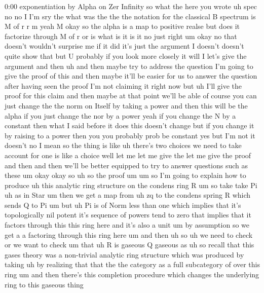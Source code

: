\begin{unfinished}{0:00}
exponentiation  by  Alpha  on  Zer
Infinity  so  what  the  here  you
wrote  uh  spec  no  no  I  I'm  sry  the  what
was  the  the  the  notation  for  the
classical  B
spectrum  is  M  of  r  r  m  yeah  M  okay  so
the  alpha  is  a  map  to  positive  realse
but  does  it  factorize  through  M  of  r  or
is  what  is  it  is
it
no  just
right  um
okay  no  that  doesn't  wouldn't  surprise
me  if  it  did  it's  just  the  argument  I
doesn't  doesn't  quite  show  that  but  U
probably  if  you  look  more  closely  it
will
I  let's  give  the  argument  and  then  uh
and  then  maybe  try  to  address  the
question  I'm  going  to  give  the  proof  of
this  and  then  maybe  it'll  be  easier  for
us  to  answer  the
question  after  having  seen  the
proof  I'm  not  claiming  it  right  now  but
uh  I'll  give  the  proof  for  this  claim
and  then  maybe  at  that  point  we'll  be
able  of  course  you  can  just  change  the
the  norm  on  Itself  by  taking  a  power  and
then  this  will  be  the  alpha  if  you  just
change  the  nor  by  a  power  yeah  if  you
change  the  N  by  a  constant  then  what  I
said  before  it  does  this  doesn't  change
but  if  you  change  it  by  raising  to  a
power  then  you  you  probably  prob  be
constant  yes  but  I'm  not  it  doesn't  no  I
mean  so  the  thing  is  like  uh  there's  two
choices  we  need  to  take  account  for  one
is  like  a  choice  well  let  me  let  me  give
the  let  me  give  the  proof  and  then  and
then  we'll  be  better  equipped  to  try  to
answer
questions  such  as
these
um
okay  okay
so  uh  so  the  proof
um  um
so  I'm  going  to  explain  how  to
produce  uh  this  analytic  ring  structure
on  the  condens  ring
R  um  so  take  take
Pi  uh  as  in
Star
um  then  we  get  a  map
from  uh
zq  to  the  condens  spring  R  which  sends  Q
to  Pi
um  but  uh  Pi  is  of  Norm  less  than  one
which  implies  that  it's  topologically
nil  potent  it's  sequence  of  powers  tend
to  zero  that  implies  that  it  factors
through  this  this  ring  here  and  it's
also  a
unit  um  by  assumption  so  we  get  a  a
factoring  through  this  ring  here  um  and
then  uh
so  uh  we  need  to  check  or  we  want  to
check  um  that  uh  R  is
gaseous  Q
gaseous  as
uh  so  recall  that  this  gases  theory  was
a  non-trivial  analytic  ring
structure  which  was  produced  by  taking
uh  by  realizing  that  that  the  the
category  as  a  full  subcategory  of  over
this  ring  um  and  then  there's  this
completion  procedure  which  changes  the
underlying  ring  to  this  gaseous  thing

\end{unfinished}
